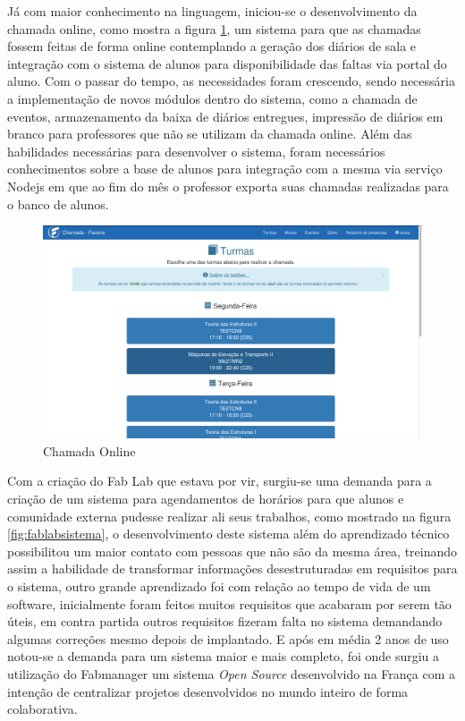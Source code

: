 \documentclass[
	12pt,				%
	oneside,			%
	a4paper,			%
	chapter=TITLE,		%
	section=TITLE,		%
	sumario=tradicional %
	english,			%
	french,				%
	spanish,			%
	brazil				%
	]{abntex2}
\begin{document}
Já com maior conhecimento na linguagem, iniciou-se o desenvolvimento da chamada online, como mostra a figura \ref{fig:chamada}, um sistema para que as chamadas fossem feitas de forma online contemplando a geração dos diários de sala e integração com o sistema de alunos para disponibilidade das faltas via portal do aluno. Com o passar do tempo, as necessidades foram crescendo, sendo necessária a implementação de novos módulos dentro do sistema, como a chamada de eventos, armazenamento da baixa de diários entregues, impressão de diários em branco para professores que não se utilizam da chamada online. Além das habilidades necessárias para desenvolver o sistema, foram necessários conhecimentos sobre a base de alunos para integração com a mesma via serviço Nodejs em que ao fim do mês o professor exporta suas chamadas realizadas para o banco de alunos.

\begin{figure}[htb]
	\caption{\label{fig:chamada} Chamada Online}
	\begin{center}
		\includegraphics[scale=0.3]{chamada}
	\end{center}
\end{figure}

Com a criação do Fab Lab que estava por vir, surgiu-se uma demanda para a criação de um sistema para agendamentos de horários para que alunos e comunidade externa pudesse realizar ali seus trabalhos, como mostrado na figura \ref{fig:fablabsistema}, o desenvolvimento deste sistema além do aprendizado técnico possibilitou um maior contato com pessoas que não são da mesma área, treinando assim a habilidade de transformar informações desestruturadas em requisitos para o sistema, outro grande aprendizado foi com relação ao tempo de vida de um software, inicialmente foram feitos muitos requisitos que acabaram por serem tão úteis, em contra partida outros requisitos fizeram falta no sistema demandando algumas correções mesmo depois de implantado. E após em média 2 anos de uso notou-se a demanda para um sistema maior e mais completo, foi onde surgiu a utilização do Fabmanager um sistema \textit{Open Source} desenvolvido na França com a intenção de centralizar projetos desenvolvidos no mundo inteiro de forma colaborativa.
\end{document}
